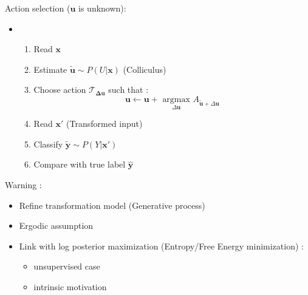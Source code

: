 Action selection ($\boldsymbol{u}$ is unknown):
\begin{itemize}
	\item 

\begin{enumerate}
	\item Read $\boldsymbol{x}$
	\item Estimate $\tilde{\boldsymbol{u}} \sim P(U|\boldsymbol{x})$ (Colliculus)
	\item Choose action $\mathcal{T}_{\boldsymbol{\Delta u}}$ such that :
			 $$\boldsymbol{u} \leftarrow \boldsymbol{u} + \underset{\Delta\boldsymbol{u}} {\text{ argmax }}
			A_{\tilde{\boldsymbol{u}} + \Delta\boldsymbol{u}}$$
	\item Read $\boldsymbol{x}'$ (Transformed input)
	\item Classify $\tilde{\boldsymbol{y}} \sim P(Y|\boldsymbol{x}')$
	\item Compare with true label $\hat{\boldsymbol{y}}$
\end{enumerate}
\end{itemize}

Warning :
\begin{itemize}
	\item Refine transformation model (Generative process)
	\item Ergodic assumption
	\item Link with log posterior maximization (Entropy/Free Energy minimization) :
	\begin{itemize}
		\item unsupervised case
		\item intrinsic motivation
	\end{itemize}
\end{itemize}
